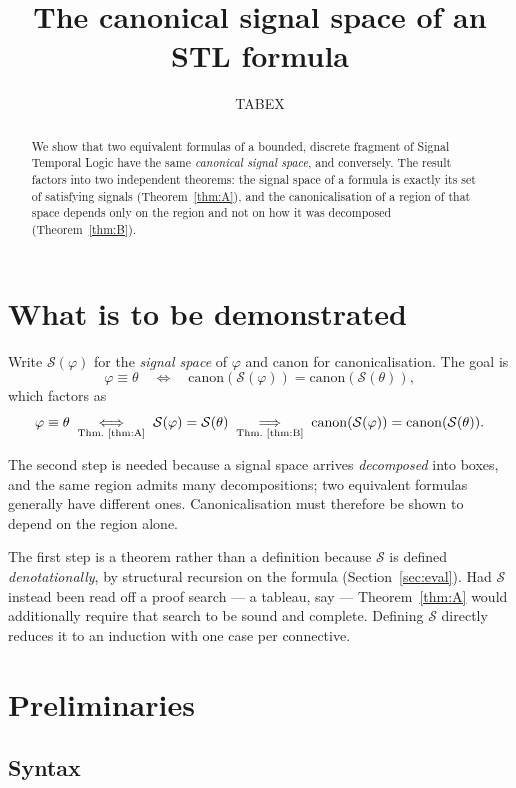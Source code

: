 \documentclass[11pt,a4paper]{article}
\title{The canonical signal space of an STL formula}
\author{TABEX}
\date{}
\theoremstyle{plain}
\theoremstyle{definition}
\theoremstyle{remark}
\newcommand{\can}{\mathrm{canon}}
\newcommand{\Sig}{\mathcal{S}}
\begin{document}
\maketitle

\begin{abstract}
We show that two equivalent formulas of a bounded, discrete fragment of Signal
Temporal Logic have the same \emph{canonical signal space}, and conversely. The
result factors into two independent theorems: the signal space of a formula is
exactly its set of satisfying signals (Theorem~\ref{thm:A}), and the
canonicalisation of a region of that space depends only on the region and not on
how it was decomposed (Theorem~\ref{thm:B}).
\end{abstract}

\section{What is to be demonstrated}\label{sec:goal}

Write $\Sig(\varphi)$ for the \emph{signal space} of $\varphi$ and $\can$ for
canonicalisation. The goal is
\[
  \varphi \equiv \theta
  \quad\Longleftrightarrow\quad
  \can(\Sig(\varphi)) = \can(\Sig(\theta)),
\]
which factors as
\[
  \varphi \equiv \theta
  \;\underset{\text{Thm.\ \ref{thm:A}}}{\Longleftrightarrow}\;
  \Sig(\varphi) = \Sig(\theta)
  \;\underset{\text{Thm.\ \ref{thm:B}}}{\Longrightarrow}\;
  \can(\Sig(\varphi)) = \can(\Sig(\theta)).
\]

The second step is needed because a signal space arrives \emph{decomposed} into
boxes, and the same region admits many decompositions; two equivalent formulas
generally have different ones. Canonicalisation must therefore be shown to
depend on the region alone.

The first step is a theorem rather than a definition because $\Sig$ is defined
\emph{denotationally}, by structural recursion on the formula
(Section~\ref{sec:eval}). Had $\Sig$ instead been read off a proof search --- a
tableau, say --- Theorem~\ref{thm:A} would additionally require that search to be
sound and complete. Defining $\Sig$ directly reduces it to an induction with one
case per connective.

\section{Preliminaries}

\subsection{Syntax}
\end{document}

